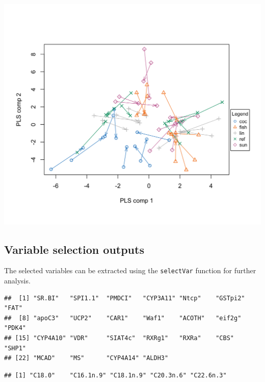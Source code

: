 \documentclass[]{book}
\newenvironment{Shaded}{\begin{snugshade}}{\end{snugshade}}
\newcommand{\KeywordTok}[1]{\textcolor[rgb]{0.13,0.29,0.53}{\textbf{#1}}}
\newcommand{\DataTypeTok}[1]{\textcolor[rgb]{0.13,0.29,0.53}{#1}}
\newcommand{\DecValTok}[1]{\textcolor[rgb]{0.00,0.00,0.81}{#1}}
\newcommand{\StringTok}[1]{\textcolor[rgb]{0.31,0.60,0.02}{#1}}
\newcommand{\CommentTok}[1]{\textcolor[rgb]{0.56,0.35,0.01}{\textit{#1}}}
\newcommand{\OperatorTok}[1]{\textcolor[rgb]{0.81,0.36,0.00}{\textbf{#1}}}
\newcommand{\NormalTok}[1]{#1}
\theoremstyle{definition}
\theoremstyle{definition}
\theoremstyle{definition}
\theoremstyle{remark}
\begin{document}
\begin{center}\includegraphics[width=0.5\linewidth]{Figures/unnamed-chunk-8-1} \end{center}

\subsection{Variable selection
outputs}\label{variable-selection-outputs-1}

The selected variables can be extracted using the \texttt{selectVar}
function for further analysis.

\begin{Shaded}
\end{Shaded}

\begin{verbatim}
##  [1] "SR.BI"   "SPI1.1"  "PMDCI"   "CYP3A11" "Ntcp"    "GSTpi2"  "FAT"    
##  [8] "apoC3"   "UCP2"    "CAR1"    "Waf1"    "ACOTH"   "eif2g"   "PDK4"   
## [15] "CYP4A10" "VDR"     "SIAT4c"  "RXRg1"   "RXRa"    "CBS"     "SHP1"   
## [22] "MCAD"    "MS"      "CYP4A14" "ALDH3"
\end{verbatim}

\begin{Shaded}
\end{Shaded}

\begin{verbatim}
## [1] "C18.0"    "C16.1n.9" "C18.1n.9" "C20.3n.6" "C22.6n.3"
\end{verbatim}
\end{document}
